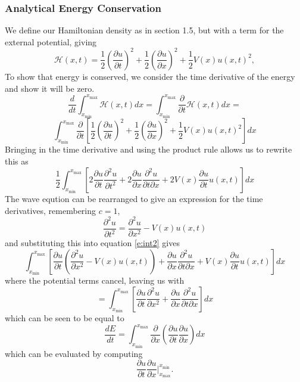 \documentclass[10pt]{article}
\begin{document}
\subsubsection*{Analytical Energy Conservation}
We define our Hamiltonian density as in section 1.5, but with
a term for the external potential, giving
\begin{equation}
\mathcal{H}(x,t) = \frac{1}{2}\left(\frac{\partial u}{\partial t}\right)^2
+\frac{1}{2}\left(\frac{\partial u}{\partial x}\right)^2 +\frac{1}{2}V(x)u(x,t)^2,
\label{e:ham}
\end{equation}
To show that energy is conserved, we consider the time derivative of the energy and show it
will be zero.
$$ \frac{d}{dt} \int_{x_\text{min}}^{x_\text{max}} \mathcal{H}(x,t)dx =
\int_{x_\text{min}}^{x_\text{max}} \frac{\partial}{\partial t}\mathcal{H}(x,t)dx = $$
\begin{equation}
\int_{x_\text{min}}^{x_\text{max}} \frac{\partial}{\partial t} \left[
\frac{1}{2}\left(\frac{\partial u}{\partial t}\right)^2
+\frac{1}{2}\left(\frac{\partial u}{\partial x}\right)^2 +\frac{1}{2}V(x)u(x,t)^2\right] dx
\label{e:int1}
\end{equation}
Bringing in the time derivative and using the product rule allows us to rewrite this as
$$
  \frac{1}{2}\int_{x_\text{min}}^{x_\text{max}} \left[
  2\frac{\partial u}{\partial t}\frac{\partial^2 u}{\partial t^2}+
  2\frac{\partial u}{\partial x}\frac{\partial^2 u}{\partial t \partial x}
  +2V(x)\frac{\partial u}{\partial t}u(x,t)\right] dx
$$
The wave eqution can be rearranged to give an expression for the time derivatives, remembering $c=1$,
$$ \frac{\partial^2 u}{\partial t^2} = \frac{\partial^2 u}{\partial x^2} - V(x)u(x,t)$$
and substituting this into equation \ref{e:int2} gives
$$
  \int_{x_\text{min}}^{x_\text{max}} \left[
  \frac{\partial u}{\partial t}\left(\frac{\partial^2 u}{\partial x^2}- V(x)u(x,t)\right)+
  \frac{\partial u}{\partial x}\frac{\partial^2 u}{\partial t \partial x}
  +V(x)\frac{\partial u}{\partial t}u(x,t)\right] dx
$$
where the potential terms cancel, leaving us with
$$
  =\int_{x_\text{min}}^{x_\text{max}} \left[
  \frac{\partial u}{\partial t}\frac{\partial^2 u}{\partial x^2}
  +\frac{\partial u}{\partial x}\frac{\partial^2 u}{\partial t \partial x}\right] dx
$$
which can be seen to be equal to
\begin{equation}
  \frac{dE}{dt} =
  \int_{x_\text{min}}^{x_\text{max}} \frac{\partial}{\partial x}\left(\frac{\partial u}{\partial t}
  \frac{\partial u}{\partial x}\right) dx
\label{e:int2}
\end{equation}
which can be evaluated by computing
\begin{equation}
  \frac{\partial u}{\partial t} \frac{\partial u}{\partial x} \Big| ^{x_\text{min}}_{x_\text{max}}.
\label{e:int3}
\end{equation}
\end{document}
